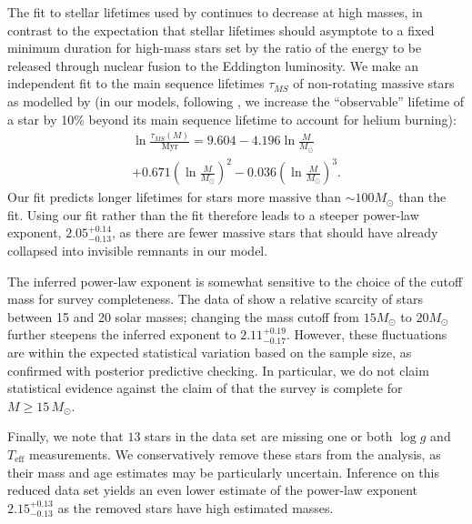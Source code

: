 \documentclass[apjl]{emulateapj}
\newcommand{\MSun}{M_\odot}
\newcommand{\onesigrange}[3]{\ensuremath{#1^{+#2}_{-#3}}}
\newcommand{\alpharangetwo}{\onesigrange{2.05}{0.14}{0.13}}
\newcommand{\alpharangethree}{\onesigrange{2.11}{0.19}{0.17}}
\newcommand{\alpharangefour}{\onesigrange{2.15}{0.13}{0.13}}
\begin{document}
The fit to stellar lifetimes used by \citet{Schneider:2018} continues to
decrease at high masses, in contrast to the expectation that stellar lifetimes
should asymptote to a fixed minimum duration for high-mass stars set by the
ratio of the energy to be released through nuclear fusion to the Eddington
luminosity.  We make an independent fit to the main sequence lifetimes
$\tau_{MS}$ of non-rotating massive stars as modelled by \citet{Brott:2011} (in
our models, following \citet{Schneider:2018}, we increase the ``observable''
lifetime of a star by 10\% beyond its main sequence lifetime to account for
helium burning):
%
\begin{multline}
\ln \frac{\tau_{MS} (M)}{\textrm{Myr}} = 9.604 - 4.196 \ln\frac{M}{M_\odot} \\ + 0.671 \left(\ln\frac{M}{M_\odot} \right)^2 - 0.036 \left(\ln\frac{M}{M_\odot}\right)^3.
\end{multline}
%
Our fit predicts longer lifetimes for stars more massive than $\sim 100 M_\odot$
than the \citet{Schneider:2018} fit.  Using our fit rather than the
\citet{Schneider:2018} fit therefore leads to a steeper power-law exponent,
$\alpharangetwo$, as there are fewer massive stars that should have already
collapsed into invisible remnants in our model.

The inferred power-law exponent is somewhat sensitive to
the choice of the cutoff mass for survey completeness.  The data of \citet{Schneider:2018} show a relative scarcity of stars between 15 and 20 solar masses; changing the mass cutoff from $15 M_\odot$ to $20 M_\odot$ further steepens the inferred exponent to $\alpharangethree$.    However, these fluctuations are within the expected statistical
variation based on the sample size, as confirmed with posterior predictive
checking.  In particular, we do not claim statistical evidence against the claim of \citet{Schneider:2018} that
the survey is complete for $M \geq 15 \, \MSun$.

Finally, we note that $13$ stars in the \citet{Schneider:2018} data set are
missing one or both $\log g$ and $T_\textrm{eff}$ measurements.  We
conservatively remove these stars from the analysis, as their mass and age
estimates may be particularly uncertain.  Inference on this reduced data set
yields an even lower estimate of the power-law exponent $\alpharangefour$ as
the removed stars have high estimated masses.
\end{document}

